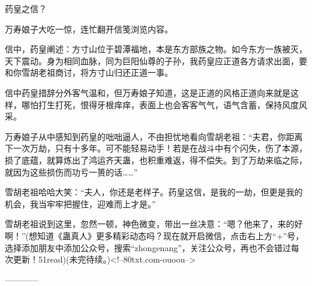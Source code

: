 \begin{this_body}
药皇之信？

万寿娘子大吃一惊，连忙翻开信笺浏览内容。

信中，药皇阐述：方寸山位于碧潭福地，本是东方部族之物。如今东方一族被灭，天下震动。身为相同血脉，同为巨阳仙尊的子孙，我药皇应正道各方请求出面，要和你雪胡老祖商讨，将方寸山归还正道一事。

信中药皇措辞分外客气温和，但万寿娘子知道，这是正道的风格正道向来就是这样，哪怕打生打死，恨得牙根痒痒，表面上也会客客气气，语气含蓄，保持风度风采。

万寿娘子从中感知到药皇的咄咄逼人，不由担忧地看向雪胡老祖：“夫君，你距离下一次万劫，只有十多年。可不能轻易动手！若是在战斗中有个闪失，伤了本源，损了底蕴，就算炼出了鸿运齐天蛊，也积重难返，得不偿失。到了万劫来临之际，就因为这些损伤而功亏一篑的话……”

雪胡老祖哈哈大笑：“夫人，你还是老样子。药皇这信，是我的一劫，但更是我的机会，我当牢牢把握住，迎难而上才是。”

雪胡老祖说到这里，忽然一顿，神色微变，带出一丝决意：“嗯？他来了，来的好啊！”(想知道《蛊真人》更多精彩动态吗？现在就开启微信，点击右上方“+”号，选择添加朋友中添加公众号，搜索“zhongenang”，关注公众号，再也不会错过每次更新！51read)(未完待续。)<!--80txt.com-ouoou-->

------------

\end{this_body}

